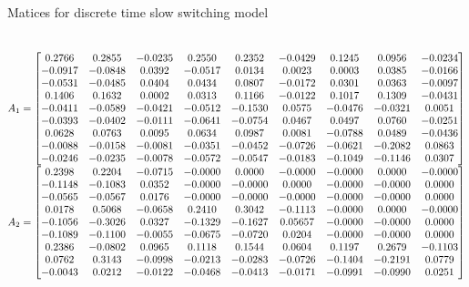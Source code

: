 %
\begin{table}
\caption{Matices for discrete time slow switching model}~\label{matrices:slow}
{\scriptsize
$A_1=\left[\begin{matrix}0.2766  &  0.2855&   -0.0235&    0.2550&    0.2352&   -0.0429&    0.1245&    0.0956&   -0.0234\\
   -0.0917&   -0.0848&    0.0392&   -0.0517&    0.0134&    0.0023&    0.0003&    0.0385 &  -0.0166\\
   -0.0531&   -0.0485&    0.0404&    0.0434&    0.0807&   -0.0172&    0.0301&    0.0363&   -0.0097\\
    0.1406&    0.1632&    0.0002&    0.0313&    0.1166&   -0.0122&    0.1017&    0.1309&   -0.0431\\
   -0.0411&   -0.0589&   -0.0421&   -0.0512&   -0.1530&    0.0575&   -0.0476&   -0.0321&    0.0051\\
   -0.0393&   -0.0402&   -0.0111&   -0.0641&   -0.0754&    0.0467&    0.0497&    0.0760&   -0.0251\\
    0.0628&    0.0763&    0.0095&    0.0634&    0.0987&    0.0081&   -0.0788&    0.0489&   -0.0436\\
   -0.0088&   -0.0158&   -0.0081&   -0.0351&   -0.0452&   -0.0726&   -0.0621&   -0.2082&    0.0863\\
   -0.0246&   -0.0235&   -0.0078&   -0.0572&   -0.0547&   -0.0183&   -0.1049&   -0.1146&    0.0307\end{matrix}\right]$
$A_2=\left[\begin{matrix} 0.2398 &   0.2204&   -0.0715&   -0.0000&    0.0000&   -0.0000&   -0.0000&    0.0000&   -0.0000\\
   -0.1148&   -0.1083&    0.0352&   -0.0000&   -0.0000&    0.0000&   -0.0000&   -0.0000&    0.0000\\
   -0.0565&   -0.0567&    0.0176&   -0.0000&   -0.0000&   -0.0000&   -0.0000&   -0.0000&    0.0000\\
    0.0178&    0.5068 &  -0.0658&    0.2410&    0.3042&   -0.1113&   -0.0000&    0.0000&   -0.0000\\
   -0.1056&  -0.3026&    0.0327&   -0.1329&   -0.1627&    0.05657&   -0.0000&   -0.0000&    0.0000\\
   -0.1089&   -0.1100&   -0.0055&   -0.0675&   -0.0720&    0.0204&   -0.0000&   -0.0000&    0.0000\\
    0.2386&   -0.0802&    0.0965&    0.1118&    0.1544&    0.0604&    0.1197&    0.2679&   -0.1103\\
    0.0762&    0.3143&   -0.0998&   -0.0213&   -0.0283&   -0.0726&   -0.1404&   -0.2191&    0.0779\\
   -0.0043&    0.0212&   -0.0122&   -0.0468&   -0.0413&   -0.0171&   -0.0991&   -0.0990&    0.0251\end{matrix}\right]$
}
\end{table}
